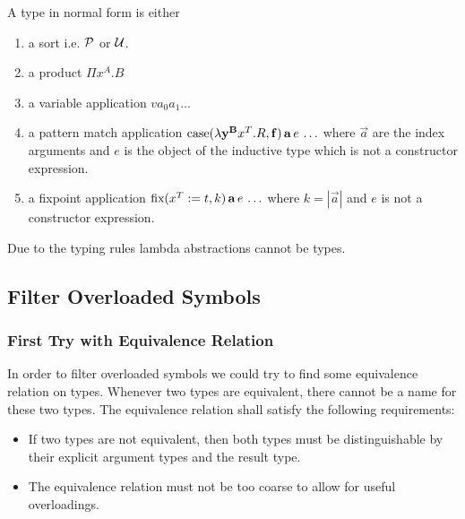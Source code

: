 A type in normal form is either
\begin{enumerate}

\item a sort i.e. ${\cal{P}}$ or ${\cal{U}}$.

\item a product $\Pi x^A. B$

\item a variable application $v a_0 a_1 \ldots$

\item a pattern match application
    $\text{case}(\lambda \mathbf{y}^{\mathbf{B}} x^T. R, \mathbf{f}) \,\mathbf{a}\, e\, \ldots$
    where $\vec{a}$ are the index arguments and $e$ is the object of the
    inductive type which is not a constructor expression.

\item a fixpoint application
    $\text{fix}(x^T := t, k)\, \mathbf{a}\, e\, \ldots$
    where $k = |\vec{a}|$ and $e$ is not a constructor expression.
\end{enumerate}
%
Due to the typing rules lambda abstractions cannot be types.





\subsection{Filter Overloaded Symbols}

\subsubsection{First Try with Equivalence Relation}

In order to filter overloaded symbols we could try to find some equivalence
relation on types. Whenever two types are equivalent, there cannot be a name for
these two types. The equivalence relation shall satisfy the following
requirements:

\begin{itemize}

\item If two types are not equivalent, then both types must be distinguishable
by their explicit argument types and the result type.

\item The equivalence relation must not be too coarse to allow for useful
overloadings.

\end{itemize}

